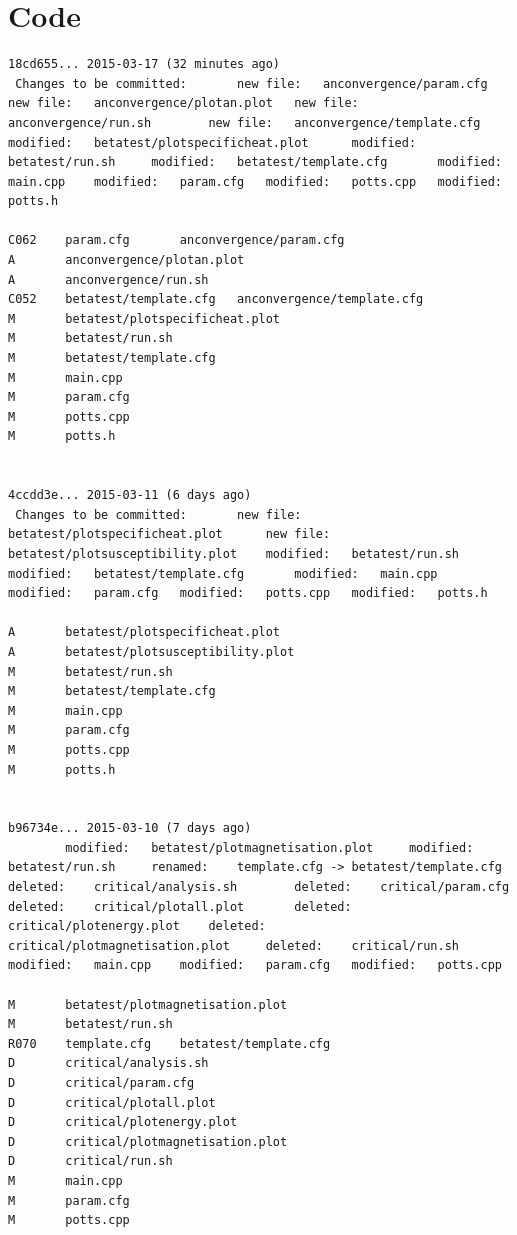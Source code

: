 \documentclass[12pt,a4paper,notitlepage,twoside]{article}
\begin{document}
\section{Code}

\begin{lstlisting}[breaklines]
18cd655... 2015-03-17 (32 minutes ago)
 Changes to be committed:       new file:   anconvergence/param.cfg     new file:   anconvergence/plotan.plot   new file:   anconvergence/run.sh        new file:   anconvergence/template.cfg  modified:   betatest/plotspecificheat.plot      modified:   betatest/run.sh     modified:   betatest/template.cfg       modified:   main.cpp    modified:   param.cfg   modified:   potts.cpp   modified:   potts.h

C062    param.cfg       anconvergence/param.cfg
A       anconvergence/plotan.plot
A       anconvergence/run.sh
C052    betatest/template.cfg   anconvergence/template.cfg
M       betatest/plotspecificheat.plot
M       betatest/run.sh
M       betatest/template.cfg
M       main.cpp
M       param.cfg
M       potts.cpp
M       potts.h


4ccdd3e... 2015-03-11 (6 days ago)
 Changes to be committed:       new file:   betatest/plotspecificheat.plot      new file:   betatest/plotsusceptibility.plot    modified:   betatest/run.sh     modified:   betatest/template.cfg       modified:   main.cpp    modified:   param.cfg   modified:   potts.cpp   modified:   potts.h

A       betatest/plotspecificheat.plot
A       betatest/plotsusceptibility.plot
M       betatest/run.sh
M       betatest/template.cfg
M       main.cpp
M       param.cfg
M       potts.cpp
M       potts.h


b96734e... 2015-03-10 (7 days ago)
        modified:   betatest/plotmagnetisation.plot     modified:   betatest/run.sh     renamed:    template.cfg -> betatest/template.cfg       deleted:    critical/analysis.sh        deleted:    critical/param.cfg  deleted:    critical/plotall.plot       deleted:    critical/plotenergy.plot    deleted:    critical/plotmagnetisation.plot     deleted:    critical/run.sh     modified:   main.cpp    modified:   param.cfg   modified:   potts.cpp

M       betatest/plotmagnetisation.plot
M       betatest/run.sh
R070    template.cfg    betatest/template.cfg
D       critical/analysis.sh
D       critical/param.cfg
D       critical/plotall.plot
D       critical/plotenergy.plot
D       critical/plotmagnetisation.plot
D       critical/run.sh
M       main.cpp
M       param.cfg
M       potts.cpp



\end{lstlisting}
\end{document}
